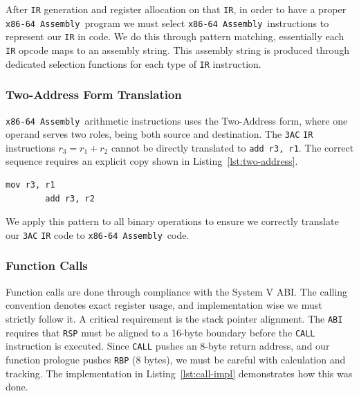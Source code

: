 \documentclass[11pt]{article}
\newcommand{\code}[1]{\texttt{#1}}
\newcommand{\constant}[1]{\texttt{#1}}
\newcommand{\asm}{\texttt{x86-64 Assembly}}
\newcommand{\lstref}[1]{Listing~\ref{#1}}
\begin{document}
After \constant{IR} generation and register allocation on that \constant{IR}, in order to have a proper \asm\ program we must select \asm\ instructions to represent our \constant{IR} in code. We do this through pattern matching, essentially each \constant{IR} opcode maps to an assembly string. This assembly string is produced through dedicated selection functions for each type of \constant{IR} instruction.

\subsubsection{Two-Address Form Translation}

\asm\ arithmetic instructions uses the Two-Address form, where one operand serves two roles, being both source and destination. The \constant{3AC} \constant{IR} instructions $r_3 = r_1 + r_2$ cannot be directly translated to \code{add r3, r1}. The correct sequence requires an explicit copy shown in \lstref{lst:two-address}.

\begin{lstlisting}[language={[x86masm]Assembler}, caption={Two-Address Form Conversion}, label={lst:two-address}, numbers=none]
		mov r3, r1
		add r3, r2
	\end{lstlisting}

We apply this pattern to all binary operations to ensure we correctly translate our \constant{3AC} \constant{IR} code to \asm\ code.

\subsubsection{Function Calls}

Function calls are done through compliance with the System V ABI. The calling convention denotes exact register usage, and implementation wise we must strictly follow it. A critical requirement is the stack pointer alignment. The \constant{ABI} requires that \code{RSP} must be aligned to a 16-byte boundary before the \constant{CALL} instruction is executed. Since \constant{CALL} pushes an 8-byte return address, and our function prologue pushes \code{RBP} (8 bytes), we must be careful with calculation and tracking. The implementation in \lstref{lst:call-impl} demonstrates how this was done.
\end{document}
